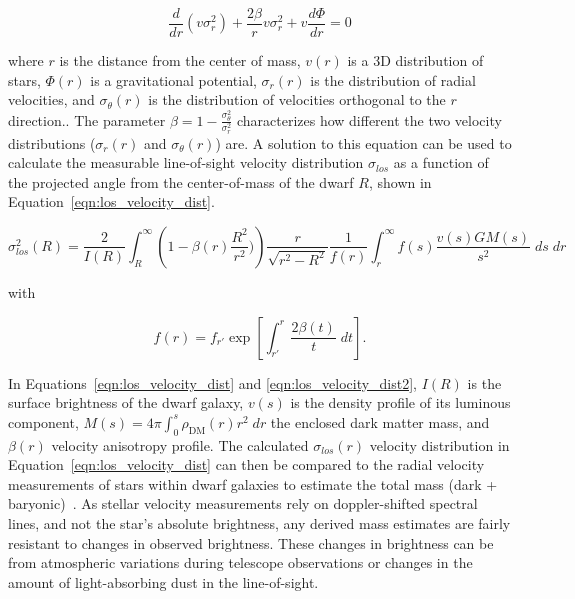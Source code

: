 \begin{equation}\label{eqn:jeans}
  \frac{d}{dr} \left ( v \sigma_r^2\right) + \frac{2 \beta}{r}v \sigma_r^2 + v \frac{d \Phi}{dr}=0
\end{equation}

where $r$ is the distance from the center of mass, $v(r)$ is a 3D distribution of stars, $\Phi(r)$ is a gravitational potential, $\sigma_r(r)$ is the distribution of radial velocities, and $\sigma_\theta(r)$ is the distribution of velocities orthogonal to the $r$ direction..
The parameter $\beta = 1 - \frac{\sigma_{\theta}^2}{\sigma_r^2}$ characterizes how different the two velocity distributions ($\sigma_r(r)$ and $\sigma_{\theta}(r)$) are.
A solution to this equation can be used to calculate the measurable line-of-sight velocity distribution $\sigma_{los}$ as a function of the projected angle from the center-of-mass of the dwarf $R$, shown in Equation~\ref{eqn:los_velocity_dist}.

\begin{equation}\label{eqn:los_velocity_dist}
  \sigma_{los}^2 \left ( R \right ) = \frac{2}{I(R)} \int_R^{\infty} \left ( 1 - \beta(r) \frac{R^2}{r^2}) \right ) \frac{r}{\sqrt{r^2-R^2}} \frac{1}{f(r)} \int_r^\infty f(s) \frac{v(s)GM(s)}{s^2} \; ds\; dr
\end{equation}

with

\begin{equation}\label{eqn:los_velocity_dist2}
  f(r) = f_{r'} \exp \left [ \int_{r'}^r \frac{2 \beta(t) }{t} \; dt \right ] .
\end{equation}

In Equations~\ref{eqn:los_velocity_dist} and \ref{eqn:los_velocity_dist2}, $I(R)$ is the surface brightness of the dwarf galaxy, $v(s)$ is the density profile of its luminous component, $M(s)=4\pi \int_0^s \rho_{\textrm{DM}}(r) r^2 \; dr$ the enclosed dark matter mass, and $\beta(r)$ velocity anisotropy profile.
The calculated $\sigma_{los}(r)$ velocity distribution in Equation~\ref{eqn:los_velocity_dist} can then be compared to the radial velocity measurements of stars within dwarf galaxies to estimate the total mass (dark + baryonic)~\cite{dwarf_gal_vel_dispersion,dwarf_gal_vel_dispersion_a,dwarf_jfactors_no_priors}.
As stellar velocity measurements rely on doppler-shifted spectral lines, and not the star's absolute brightness, any derived mass estimates are fairly resistant to changes in observed brightness.
These changes in brightness can be from atmospheric variations during telescope observations or changes in the amount of light-absorbing dust in the line-of-sight.

